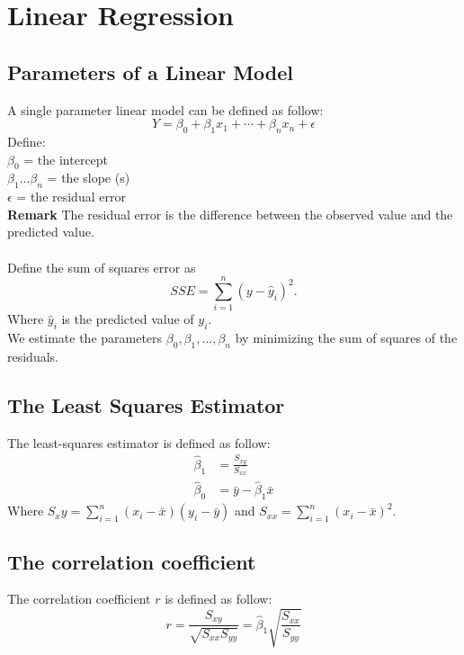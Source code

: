 \documentclass[sn-mathphys,Numbered]{sn-jnl}%
\newcommand{\Remark}{\textbf{Remark }}
\begin{document}
\section{Linear Regression}\label{linear-regression}
\subsection{Parameters of a Linear Model}\label{linear-model}
A single parameter linear model can be defined as follow:
\begin{equation}
    Y = \beta_0 + \beta_1 x_1 + \cdots + \beta_n x_n + \epsilon
\end{equation}
Define:\\
$\beta_0$ = the intercept\\
$\beta_1 \ldots \beta_n$ = the slope (s)\\
$\epsilon$ = the residual error\\
\Remark{The residual error is the difference between the observed value and the predicted value.}\\\\
Define the sum of squares error as \\
\begin{equation}
    SSE = \sum_{i=1}^n (y - \hat{y}_i)^2.
\end{equation}
Where $\hat{y}_i$ is the predicted value of $y_i$.\\
We estimate the parameters $\beta_0, \beta_1, \ldots, \beta_n$ by minimizing the sum of squares of the residuals.\\
\subsection{The Least Squares Estimator}\label{least-squares}
The least-squares estimator is defined as follow:
\begin{align}
    \hat \beta_1 & = \frac{S_{xy}}{S_{xx}}        \\
    \hat \beta_0 & = \bar y - \hat \beta_1 \bar x
\end{align}
Where $S_xy = \sum\limits_{i=1}^{n}(x_i - \bar x)(y_i - \bar y)$ and $S_{xx} = \sum\limits_{i=1}^{n}{(x_i - \bar x)}^2$.

\subsection{The correlation coefficient}\label{correlation}
The correlation coefficient $r$ is defined as follow:
\begin{equation}
    r = \frac{S_{xy}}{\sqrt{S_{xx}S_{yy}}} = \hat \beta_1 \sqrt{\frac{S_{xx}}{S_{yy}}}
\end{equation}
\end{document}
